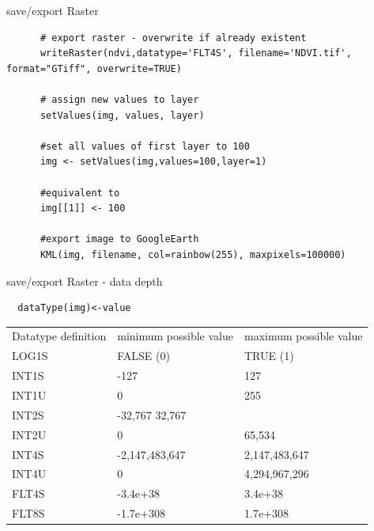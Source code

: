 \begin{frame}[fragile]{save/export Raster }

   \begin{lstlisting}
	  # export raster - overwrite if already existent
	  writeRaster(ndvi,datatype='FLT4S', filename='NDVI.tif', format="GTiff", overwrite=TRUE)
	  
	  # assign new values to layer
	  setValues(img, values, layer)
	  
	  #set all values of first layer to 100
	  img <- setValues(img,values=100,layer=1)
	  
	  #equivalent to
	  img[[1]] <- 100
	  
	  #export image to GoogleEarth
	  KML(img, filename, col=rainbow(255), maxpixels=100000) 

   \end{lstlisting}

\end{frame}


\begin{frame}[fragile]{save/export Raster - data depth}
 \begin{lstlisting}
  dataType(img)<-value
 \end{lstlisting}

\begin{tiny}
\begin{tabular}{lll}

	Datatype definition  &minimum possible value  &maximum possible value  \\
	LOG1S  &FALSE (0)&TRUE (1)  \\
	INT1S  &-127  &127  \\
	INT1U  &0  &255  \\
	INT2S  &-32,767	32,767  \\
	INT2U  &0  &65,534  \\
	INT4S  &-2,147,483,647  &2,147,483,647  \\
	INT4U  &0  &4,294,967,296  \\
	FLT4S  &-3.4e+38  &3.4e+38  \\
	FLT8S  &-1.7e+308  &1.7e+308 \\
  
\end{tabular}
\end{tiny} 
\end{frame}


